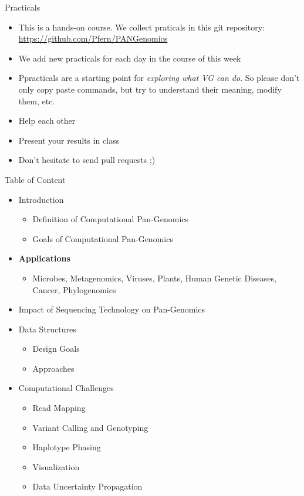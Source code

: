 \documentclass[notes=hide]{beamer}
\newcommand{\0}{\ensuremath{\mathtt{0}}}
\newcommand{\1}{\ensuremath{\mathtt{1}}}
\begin{document}
\begin{frame}{Practicals}
\begin{itemize}
 \item This is a hands-on course. We collect praticals in this git repository: \url{https://github.com/Pfern/PANGenomics}
 \item We add new practicals for each day in the course of this week
 \item Ppracticals are a starting point for \emph{exploring what VG can do}. So please don't only copy paste commands, but try to understand their meaning, modify them, etc.
 \item Help each other
 \item Present your results in class
 \item Don't hesitate to send pull requests ;) 
\end{itemize}
\end{frame}


\begin{frame}{Table of Content}
\begin{itemize}
 \item Introduction
 \begin{itemize}
    \item Definition of Computational Pan-Genomics
    \item Goals of Computational Pan-Genomics
 \end{itemize}
\item {\color{red}\textbf{Applications}}
 \begin{itemize}
    \item Microbes, Metagenomics, Viruses, Plants, Human Genetic Diseases, Cancer, Phylogenomics
 \end{itemize}
\item Impact of Sequencing Technology on Pan-Genomics
\item Data Structures
 \begin{itemize}
    \item Design Goals
    \item Approaches
 \end{itemize}
\item Computational Challenges
 \begin{itemize}
    \item Read Mapping
    \item Variant Calling and Genotyping
    \item Haplotype Phasing
    \item Visualization
    \item Data Uncertainty Propagation
 \end{itemize}
\end{itemize}
\end{frame}
\end{document}
